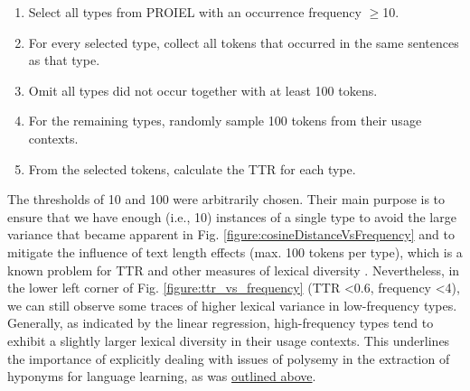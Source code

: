 \documentclass[oneside]{book}
\begin{document}
\begin{enumerate}
	\item Select all types from PROIEL with an occurrence frequency $\geq$10.
	\item For every selected type, collect all tokens that occurred in the same sentences as that type.
	\item Omit all types did not occur together with at least 100 tokens.
	\item For the remaining types, randomly sample 100 tokens from their usage contexts.
	\item From the selected tokens, calculate the \gls{TTR} for each type.
\end{enumerate}

The thresholds of 10 and 100 were arbitrarily chosen. Their main purpose is to ensure that we have enough (i.e., 10) instances of a single type to avoid the large variance that became apparent in Fig. \ref{figure:cosineDistanceVsFrequency} and to mitigate the influence of text length effects (max. 100 tokens per type), which is a known problem for \gls{TTR} and other measures of lexical diversity \parencite[66]{koizumiRelationshipsTextLength2012}. Nevertheless, in the lower left corner of Fig. \ref{figure:ttr_vs_frequency} (\gls{TTR} <0.6, frequency <4), we can still observe some traces of higher lexical variance in low-frequency types. Generally, as indicated by the linear regression, high-frequency types tend to exhibit a slightly larger lexical diversity in their usage contexts. This underlines the importance of explicitly dealing with issues of polysemy in the extraction of hyponyms for language learning, as was \hyperref[high_frequency_hyponyms_for_language_learning]{outlined above}.
\end{document}
